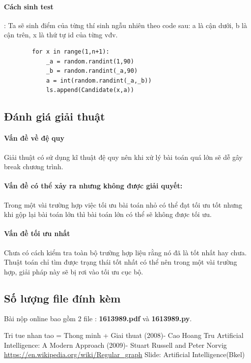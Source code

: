 \documentclass[13pt,a4paper]{article}
\begin{document}
	\paragraph{Cách sinh test}: Ta sẽ sinh điểm của từng thí sinh ngẫu nhiên theo code sau: a là cận dưới, b là cận trên, x là thứ tự id của từng vđv.
	\begin{lstlisting}
		for x in range(1,n+1):
            _a = random.randint(1,90)
            _b = random.randint(_a,90)
            a = int(random.randint(_a,_b))
            ls.append(Candidate(x,a))
	\end{lstlisting}
	
	\subsection{Đánh giá giải thuật}
	\paragraph{Vấn đề về đệ quy} Giải thuật có sử dụng kĩ thuật đệ quy nên khi xử lý bài toán quá lớn sẽ dễ gây break chương trình.
	\paragraph{Vấn đề có thể xảy ra nhưng không được giải quyết:} Trong một vài trường hợp việc tối ưu bài toán nhỏ có thể đạt tối ưu tốt nhưng khi gộp lại bài toán lớn thì bài toán lớn có thể sẽ không được tối ưu.
	\paragraph{Vấn đề tối ưu nhất} Chưa có cách kiểm tra toàn bộ trường hợp liệu rằng nó đã là tốt nhất hay chưa. Thuật toán chỉ tìm được trạng thái tốt nhất có thể nên trong một vài trường hợp, giải pháp này sẽ bị rơi vào tối ưu cục bộ.
	
	\subsection{Số lượng file đính kèm}
	Bài nộp online bao gồm 2 file : \textbf{1613989.pdf} và \textbf{1613989.py}.
\newpage
\begin{thebibliography}{80}
	 Tri tue nhan tao = Thong minh + Giai thuat (2008)- Cao Hoang Tru
	 Artificial Intelligence: A Modern Approach (2009)- Stuart Russell and Peter Norvig
	 \url{https://en.wikipedia.org/wiki/Regular_graph}
	 Slide: Artificial Intelligence(Bkel)
\end{thebibliography}
\end{document}
